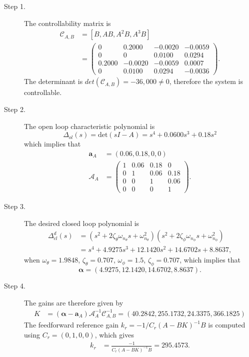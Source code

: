 \begin{description}
\item[Step 1.] 
The controllability matrix is 
\begin{align*}
\mathcal{C}_{A,B} &= [B, AB, A^2B, A^3B] \\
 	&= \begin{pmatrix}           
        0  &  0.2000  & -0.0020  & -0.0059 \\
         0 &        0 &   0.0100 &   0.0294 \\
    0.2000 &  -0.0020 &  -0.0059 &   0.0007 \\
         0 &   0.0100 &   0.0294 &  -0.0036 \end{pmatrix}.
\end{align*}
The determinant is $det(\mathcal{C}_{A,B})=-36,000\neq 0$, therefore the system is controllable.  
\item[Step 2.] The open loop characteristic polynomial is
\[
\Delta_{ol}(s)=\text{det}(sI-A) = s^4 + 0.0600 s^3 + 0.18 s^2 
\]
which implies that
\begin{align*}
\mathbf{a}_A &= (0.06, 0.18, 0, 0) \\
\mathcal{A}_A &= \begin{pmatrix} 
1 & 0.06 & 0.18 & 0 \\ 0 & 1 & 0.06 & 0.18 \\ 0 & 0 & 1 & 0.06 \\ 0 & 0 & 0 & 1
\end{pmatrix}.
\end{align*}

\item[Step 3.] The desired closed loop polynomial is
\begin{align*}
\Delta_{cl}^d(s) &= (s^2+2\zeta_{\theta}\omega_{n_\theta} s + \omega_{n_\theta}^2)(s^2+2\zeta_{\phi}\omega_{n_\phi} s + \omega_{n_\phi}^2) \\
&=s^4 + 4.9275 s^3 + 12.1420 s^2 + 14.6702 s + 8.8637,              
\end{align*}
when $\omega_\theta = 1.9848$, $\zeta_\theta = 0.707$, $\omega_\phi=1.5$, $\zeta_\phi = 0.707$, 
which implies that
\[
\boldsymbol{\alpha} = (4.9275,   12.1420,   14.6702,    8.8637).
\]

\item[Step 4.]
The gains are therefore given by
\begin{align*}
K &= (\boldsymbol{\alpha}-\mathbf{a}_A)\mathcal{A}_A^{-1}\mathcal{C}_{A,B}^{-1} 
  = (40.2842,  255.1732,   24.3375,  366.1825)
\end{align*}
The feedforward reference gain $k_r=-1/C_r(A-BK)^{-1}B$ is computed using $C_r=(0,1,0,0)$, which gives
\begin{align*}
k_r &= \frac{-1}{C_r(A-BK)^{-1}B} 
    = 295.4573.
\end{align*}
\end{description}


